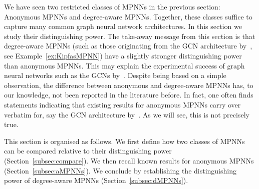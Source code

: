 We have seen two restricted classes of MPNNs in the previous section: Anonymous MPNNs and degree-aware MPNNs. Together, these classes suffice to capture many common graph neural network architectures. In this section we study their distinguishing power. The take-away message from this section is that degree-aware MPNNs (such as those originating from the GCN architecture by~\cite{kipf-loose}, see Example~\ref{ex:KipfasMPNN}) have a slightly stronger distinguishing power than anonymous MPNNs. This may explain the experimental success of graph neural networks such as the GCNs by~\cite{kipf-loose}. Despite being based on a simple observation, the difference between anonymous and degree-aware MPNNs has, to our knowledge, not been reported in the literature before. In fact, one often finds statements indicating that existing results for anonymous MPNNs \cite{xhlj19,grohewl} carry over verbatim for, say the GCN architecture
by~\cite{kipf-loose}. As we will see, this is not precisely true.

This section is organised as follows. We first define how two classes of MPNNs can be compared relative to  their distinguishing power (Section~\ref{subsec:compare}). We then recall known results for anonymous MPNNs (Section~\ref{subsec:aMPNNs}). We conclude by establishing the distinguishing power of degree-aware MPNNs (Section~\ref{subsec:dMPNNs}).




% 

